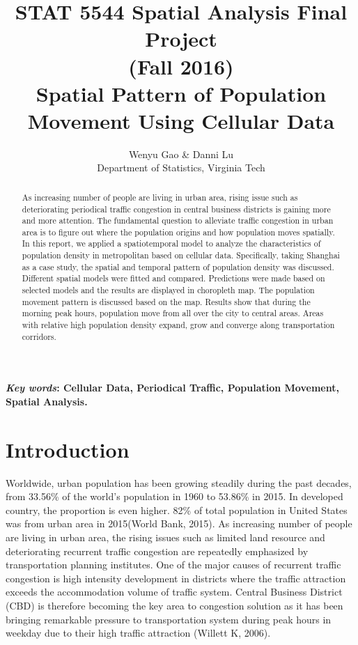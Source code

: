 \documentclass[hidelinks,12pt]{article}
\date{}
\author{Wenyu Gao \& Danni Lu \\ Department of Statistics, Virginia Tech}
\title{STAT 5544 Spatial Analysis Final Project \\ (Fall 2016) \\ Spatial Pattern of Population Movement Using Cellular Data }
\begin{document}
	\maketitle
	
	\begin{abstract}
		As increasing number of people are living in urban area, rising issue such as deteriorating periodical traffic congestion in central business districts is gaining more and more attention. The fundamental question to alleviate traffic congestion in urban area is to figure out where the population origins and how population moves spatially. In this report, we applied a spatiotemporal model to analyze the characteristics of population density in metropolitan based on cellular data. Specifically, taking Shanghai as a case study, the spatial and temporal pattern of population density was discussed. Different spatial models were fitted and compared. Predictions were made based on selected models and the results are displayed in choropleth map. The population movement pattern is discussed based on the map. Results show that during the morning peak hours, population move from all over the city to central areas. Areas with relative high population density expand, grow and converge along transportation corridors. 
	\end{abstract}
	\textbf{ {\em Key words}: Cellular Data, Periodical Traffic, Population Movement, Spatial Analysis.}
	
	\section{Introduction}\label{sec:intro}
	Worldwide, urban population has been growing steadily during the past decades, from 33.56\% of the world’s population in 1960 to 53.86\% in 2015. In developed country, the proportion is even higher. 82\% of total population in United States was from urban area in 2015(World Bank, 2015). As increasing number of people are living in urban area, the rising issues such as limited land resource and deteriorating recurrent traffic congestion are repeatedly emphasized by transportation planning institutes. One of the major causes of recurrent traffic congestion is high intensity development in districts where the traffic attraction exceeds the accommodation volume of traffic system. Central Business District (CBD) is therefore becoming the key area to congestion solution as it has been bringing remarkable pressure to transportation system during peak hours in weekday due to their high traffic attraction (Willett K, 2006). 
	
\end{document}
